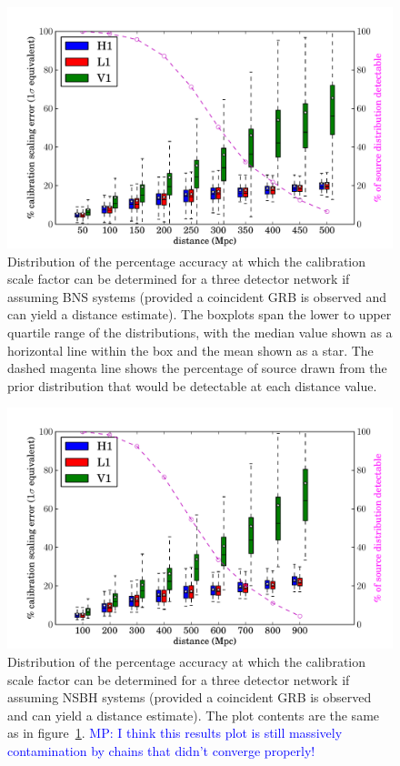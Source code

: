 \documentclass[10pt]{iopart}
\newcommand{\MP}[1]{\textcolor{blue}{MP: #1}}
\begin{document}
\begin{figure}
 \begin{center}
  \includegraphics[width=1.0\textwidth]{scale_factor.pdf}
 \end{center}
 \caption{\label{fig:bnsresults} Distribution of the percentage accuracy at which the calibration 
scale factor can be determined for a three detector network if assuming \ac{BNS} systems (provided 
a coincident GRB is observed and can yield a distance estimate). The boxplots span the lower to 
upper quartile range of the distributions, with the median value shown as a horizontal line within 
the box and the mean shown as a star. The dashed magenta line shows the percentage of source drawn 
from the prior distribution that would be detectable at each distance value.}
\end{figure}

\begin{figure}
 \begin{center}
  \includegraphics[width=1.0\textwidth]{scale_factor_nsbh.pdf}
 \end{center}
 \caption{\label{fig:nsbhresults} Distribution of the percentage accuracy at which the calibration 
scale factor can be determined for a three detector network if assuming \ac{NSBH} systems (provided 
a coincident GRB is observed and can yield a distance estimate). The plot contents are the same as 
in figure~\ref{fig:bnsresults}. \MP{I think this results plot is still massively contamination by 
chains that didn't converge properly!}}
\end{figure}
\end{document}
